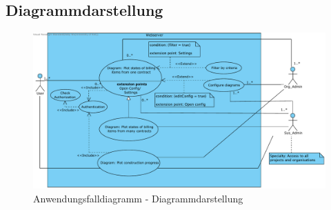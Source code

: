 \clearpage

\subsection{Diagrammdarstellung}

\begin{figure}[h]
	\centering
	\includegraphics[width=\linewidth]{img/diagrams/Diagram_Display_Management_Web.pdf}
	\caption{Anwendungsfalldiagramm - Diagrammdarstellung}
	\label{fig:anwendungsfalldiagramm-dia-management}
\end{figure}

\newpage

